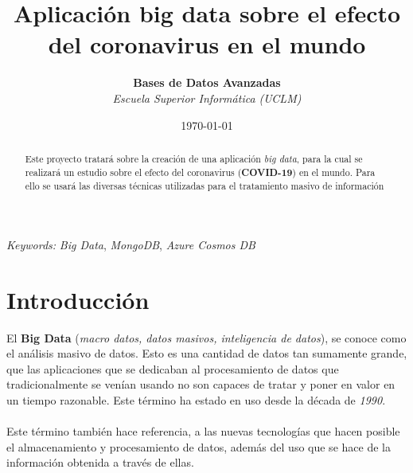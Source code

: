 \documentclass[11pt]{diazessay} %
\title{\textbf{Aplicación big data sobre el efecto del coronavirus en el mundo}} %
\author{\textbf{Bases de Datos Avanzadas} \\ \textit{Escuela Superior Informática (UCLM)}} %
\date{\today} %
\begin{document}
\maketitle %



\begin{abstract}
	
	Este proyecto tratará sobre la creación de una aplicación \textit{big data}, para la cual se realizará un estudio sobre el efecto del coronavirus (\textbf{COVID-19}) en el mundo. Para ello se usará las diversas técnicas utilizadas para el tratamiento masivo de información

\end{abstract}

\hspace*{3.6mm}\textit{Keywords:} \textit{Big Data}, \textit{MongoDB}, \textit{Azure Cosmos DB}

\vspace{20pt} %


\section*{Introducción}
El \textbf{Big Data} (\textit{macro datos, datos masivos, inteligencia de datos}), se conoce como el análisis masivo de datos. Esto es una cantidad de datos tan sumamente grande, que las aplicaciones que se dedicaban al  procesamiento de datos que tradicionalmente se venían usando no son capaces de tratar y poner en valor en un tiempo razonable. Este  término ha estado en uso desde la década de \textit{1990}.\\\\
Este término también hace referencia, a las nuevas tecnologías que hacen posible el almacenamiento y procesamiento de datos, además del uso que se hace de la información obtenida a través de ellas.
\end{document}
